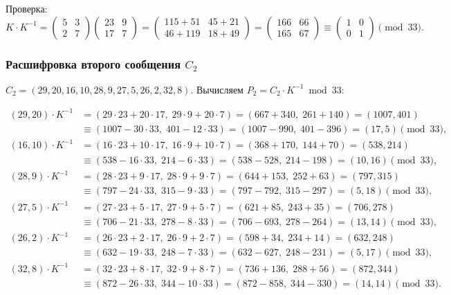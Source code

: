 Проверка:
\[
K \cdot K^{-1} = \begin{pmatrix} 5 & 3 \\ 2 & 7 \end{pmatrix} \begin{pmatrix} 23 & 9 \\ 17 & 7 \end{pmatrix} = \begin{pmatrix} 115+51 & 45+21 \\ 46+119 & 18+49 \end{pmatrix} = \begin{pmatrix} 166 & 66 \\ 165 & 67 \end{pmatrix} \equiv \begin{pmatrix} 1 & 0 \\ 0 & 1 \end{pmatrix} \pmod{33}.
\]

\subsubsection{Расшифровка второго сообщения $C_2$}

$C_2 = (29,20,16,10,28,9,27,5,26,2,32,8)$. Вычисляем $P_2 = C_2 \cdot K^{-1} \bmod 33$:

\[
\begin{aligned}
(29,20) \cdot K^{-1} &= (29\cdot 23 + 20\cdot 17,\; 29\cdot 9 + 20\cdot 7) = (667+340,\; 261+140) = (1007, 401) \\
&\equiv (1007 - 30\cdot 33,\; 401 - 12\cdot 33) = (1007-990,\; 401-396) = (17, 5) \pmod{33},\\
(16,10) \cdot K^{-1} &= (16\cdot 23 + 10\cdot 17,\; 16\cdot 9 + 10\cdot 7) = (368+170,\; 144+70) = (538, 214) \\
&\equiv (538 - 16\cdot 33,\; 214 - 6\cdot 33) = (538-528,\; 214-198) = (10, 16) \pmod{33},\\
(28,9) \cdot K^{-1} &= (28\cdot 23 + 9\cdot 17,\; 28\cdot 9 + 9\cdot 7) = (644+153,\; 252+63) = (797, 315) \\
&\equiv (797 - 24\cdot 33,\; 315 - 9\cdot 33) = (797-792,\; 315-297) = (5, 18) \pmod{33},\\
(27,5) \cdot K^{-1} &= (27\cdot 23 + 5\cdot 17,\; 27\cdot 9 + 5\cdot 7) = (621+85,\; 243+35) = (706, 278) \\
&\equiv (706 - 21\cdot 33,\; 278 - 8\cdot 33) = (706-693,\; 278-264) = (13, 14) \pmod{33},\\
(26,2) \cdot K^{-1} &= (26\cdot 23 + 2\cdot 17,\; 26\cdot 9 + 2\cdot 7) = (598+34,\; 234+14) = (632, 248) \\
&\equiv (632 - 19\cdot 33,\; 248 - 7\cdot 33) = (632-627,\; 248-231) = (5, 17) \pmod{33},\\
(32,8) \cdot K^{-1} &= (32\cdot 23 + 8\cdot 17,\; 32\cdot 9 + 8\cdot 7) = (736+136,\; 288+56) = (872, 344) \\
&\equiv (872 - 26\cdot 33,\; 344 - 10\cdot 33) = (872-858,\; 344-330) = (14, 14) \pmod{33}.
\end{aligned}
\]

